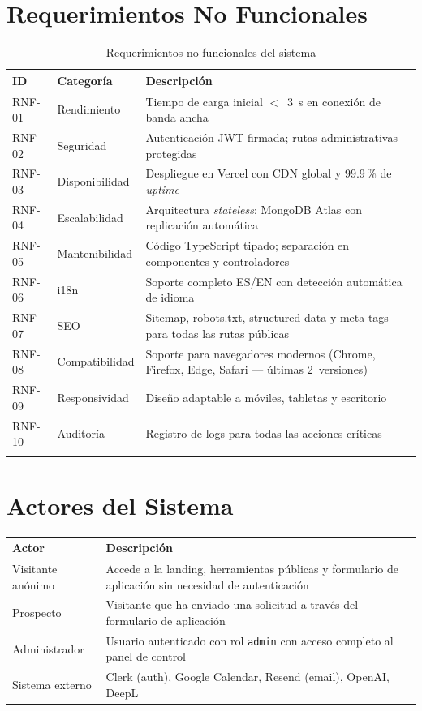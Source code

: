 \documentclass[12pt, a4paper, twoside]{report}
\begin{document}
\section{Requerimientos No Funcionales}

\begin{center}
\begin{longtable}{C{1.4cm} L{3cm} L{9cm}}
  \toprule
  \textbf{ID} & \textbf{Categoría} & \textbf{Descripción} \\
  \midrule
  \endhead
  RNF-01 & Rendimiento      & Tiempo de carga inicial \(<\)~3~s en conexión de banda ancha \\[4pt]
  RNF-02 & Seguridad        & Autenticación JWT firmada; rutas administrativas protegidas \\[4pt]
  RNF-03 & Disponibilidad   & Despliegue en Vercel con CDN global y 99.9\,\% de \textit{uptime} \\[4pt]
  RNF-04 & Escalabilidad    & Arquitectura \textit{stateless}; MongoDB Atlas con replicación automática \\[4pt]
  RNF-05 & Mantenibilidad   & Código TypeScript tipado; separación en componentes y controladores \\[4pt]
  RNF-06 & i18n             & Soporte completo ES/EN con detección automática de idioma \\[4pt]
  RNF-07 & SEO              & Sitemap, robots.txt, structured data y meta tags para todas las rutas públicas \\[4pt]
  RNF-08 & Compatibilidad   & Soporte para navegadores modernos (Chrome, Firefox, Edge, Safari — últimas 2~versiones) \\[4pt]
  RNF-09 & Responsividad    & Diseño adaptable a móviles, tabletas y escritorio \\[4pt]
  RNF-10 & Auditoría        & Registro de logs para todas las acciones críticas \\
  \bottomrule
  \caption{Requerimientos no funcionales del sistema}
\end{longtable}
\end{center}

\section{Actores del Sistema}

\begin{center}
\begin{tabular}{L{3.5cm} L{9.5cm}}
  \toprule
  \textbf{Actor} & \textbf{Descripción} \\
  \midrule
  Visitante anónimo    & Accede a la landing, herramientas públicas y formulario de aplicación sin necesidad de autenticación \\[6pt]
  Prospecto            & Visitante que ha enviado una solicitud a través del formulario de aplicación \\[6pt]
  Administrador        & Usuario autenticado con rol \texttt{admin} con acceso completo al panel de control \\[6pt]
  Sistema externo      & Clerk (auth), Google Calendar, Resend (email), OpenAI, DeepL \\
  \bottomrule
\end{tabular}
\end{center}
\end{document}
